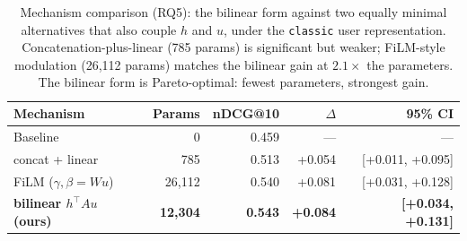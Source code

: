 \begin{table}[t]
\centering
\caption{Mechanism comparison (RQ5): the bilinear form against two equally minimal alternatives that also couple $h$ and $u$, under the \texttt{classic} user representation. Concatenation-plus-linear (785 params) is significant but weaker; FiLM-style modulation (26{,}112 params) matches the bilinear gain at $2.1\times$ the parameters. The bilinear form is Pareto-optimal: fewest parameters, strongest gain.}
\label{tab:pareto}
\begin{tabular}{lrrrr}
\toprule
Mechanism & Params & nDCG@10 & $\Delta$ & 95\% CI \\
\midrule
Baseline & 0 & 0.459 & --- & --- \\
concat + linear & 785 & 0.513 & +0.054 & [+0.011, +0.095] \\
FiLM ($\gamma,\beta = Wu$) & 26{,}112 & 0.540 & +0.081 & [+0.031, +0.128] \\
\textbf{bilinear $h^\top A u$ (ours)} & \textbf{12{,}304} & \textbf{0.543} & \textbf{+0.084} & \textbf{[+0.034, +0.131]} \\
\bottomrule
\end{tabular}
\end{table}
